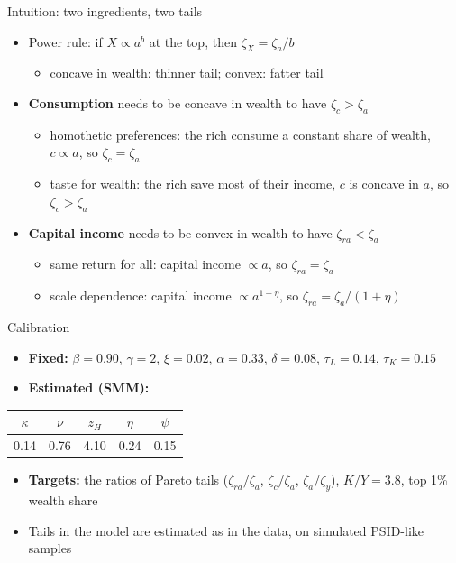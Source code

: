 \documentclass[10pt,english,10pt]{beamer}
\begin{document}
\begin{frame}{Intuition: two ingredients, two tails}
\begin{itemize}
\item Power rule: if $X\propto a^{b}$ at the top, then $\zeta_{X}=\zeta_{a}/b$
\begin{itemize}
\item concave in wealth: thinner tail; convex: fatter tail
\end{itemize}
\item \textbf{Consumption} needs to be concave in wealth to have $\zeta_{c}>\zeta_{a}$
\begin{itemize}
\item homothetic preferences: the rich consume a constant share of wealth, $c\propto a$, so $\zeta_{c}=\zeta_{a}$
\item taste for wealth: the rich save most of their income, $c$ is concave in $a$, so $\zeta_{c}>\zeta_{a}$
\end{itemize}
\item \textbf{Capital income} needs to be convex in wealth to have $\zeta_{ra}<\zeta_{a}$
\begin{itemize}
\item same return for all: capital income $\propto a$, so $\zeta_{ra}=\zeta_{a}$
\item scale dependence: capital income $\propto a^{1+\eta}$, so $\zeta_{ra}=\zeta_{a}/(1+\eta)$
\end{itemize}
\end{itemize}
\end{frame}

\begin{frame}{Calibration}
\begin{itemize}
\item \textbf{Fixed:} $\beta=0.90$, $\gamma=2$, $\xi=0.02$, $\alpha=0.33$, $\delta=0.08$, $\tau_{L}=0.14$, $\tau_{K}=0.15$
\item \textbf{Estimated (SMM):}
\end{itemize}
\begin{center}
\begin{tabular}{ccccc}
\toprule
$\kappa$ & $\nu$ & $z_{H}$ & $\eta$ & $\psi$\\
\midrule
0.14 & 0.76 & 4.10 & 0.24 & 0.15\\
\bottomrule
\end{tabular}
\end{center}
\begin{itemize}
\item \textbf{Targets:} the ratios of Pareto tails ($\zeta_{ra}/\zeta_{a}$, $\zeta_{c}/\zeta_{a}$, $\zeta_{a}/\zeta_{y}$), $K/Y=3.8$, top 1\% wealth share
\item Tails in the model are estimated as in the data, on simulated PSID-like samples
\end{itemize}
\end{frame}
\end{document}
